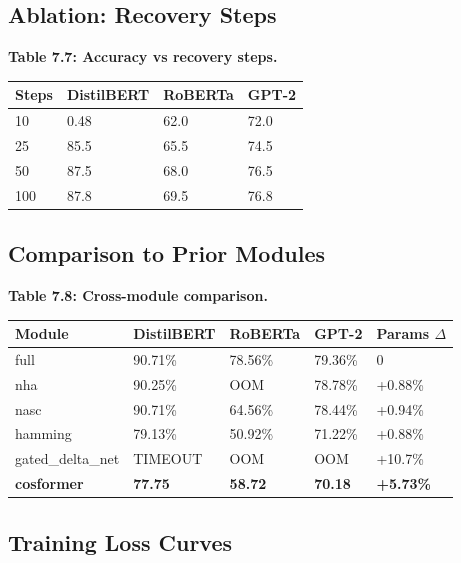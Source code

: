 \subsection{Ablation: Recovery Steps}

\textbf{Table 7.7: Accuracy vs recovery steps.}

\begin{table}[H]
\centering
\small
\begin{tabular}{llll}
\toprule
\textbf{Steps} & \textbf{DistilBERT} & \textbf{RoBERTa} & \textbf{GPT-2} \\
\midrule
10 & 0.48 & 62.0 & 72.0 \\
25 & 85.5 & 65.5 & 74.5 \\
50 & 87.5 & 68.0 & 76.5 \\
100 & 87.8 & 69.5 & 76.8 \\
\bottomrule
\end{tabular}
\end{table}

\subsection{Comparison to Prior Modules}

\textbf{Table 7.8: Cross-module comparison.}

\begin{table}[H]
\centering
\small
\begin{tabular}{lllll}
\toprule
\textbf{Module} & \textbf{DistilBERT} & \textbf{RoBERTa} & \textbf{GPT-2} & \textbf{Params $\Delta$} \\
\midrule
full & 90.71\% & 78.56\% & 79.36\% & 0 \\
nha & 90.25\% & OOM & 78.78\% & +0.88\% \\
nasc & 90.71\% & 64.56\% & 78.44\% & +0.94\% \\
hamming & 79.13\% & 50.92\% & 71.22\% & +0.88\% \\
gated\_delta\_net & TIMEOUT & OOM & OOM & +10.7\% \\
\textbf{cosformer} & \textbf{77.75} & \textbf{58.72} & \textbf{70.18} & \textbf{+5.73\%} \\
\bottomrule
\end{tabular}
\end{table}

\subsection{Training Loss Curves}

